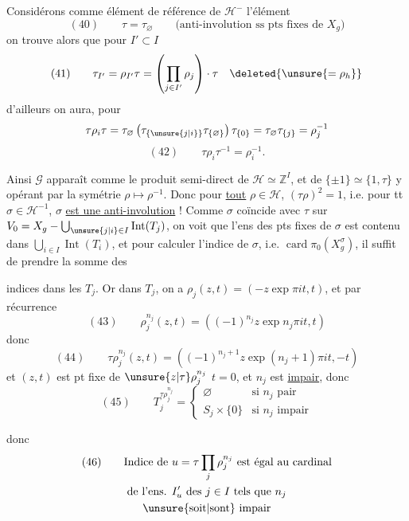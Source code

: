 
Considérons comme élément de référence de $\mathcal H^{-}$ l'élément
\[
(40)\qquad \tau=\tau_{\varnothing}\qquad
\text{(anti-involution ss pts fixes de $X_g$)}
\]
on trouve alors  que pour $I'\subset I$
\[
(41)\qquad \tau_{I'}=\rho_{I'}\tau=
\left(\prod_{j\in I'}\rho_j\right)\cdot\tau\quad
\deleted{\unsure{=\rho_h}}
\]
d'ailleurs on aura, pour 
\[
\tau\rho_{i}\tau
=\tau_{\varnothing}\left(\tau_{\{\unsure{j|i}\}}\tau_{\{\varnothing\}}\right)
\tau_{\{0\}}
=\tau_{\varnothing}\tau_{\{j\}}=\rho_j^{-1}
\]
\[
(42)\qquad \tau\rho_{i}\tau^{-1}=\rho_{i}^{-1}.
\]

Ainsi $\mathcal G$ apparaît comme le produit semi-direct de $\mathcal H\simeq\mathbb Z^I$, et de
$\{\pm1\}\simeq\{1,\tau\}$ y opérant par la symétrie
$\rho\longmapsto\rho^{-1}$. Donc pour \uline{tout} $\rho\in\mathcal H$,
$(\tau\rho)^2=1$, i.e. pour tt
$\sigma\in\mathcal H^{-1}$,
$\sigma$  \uline{est une anti-involution} !
Comme $\sigma$ coïncide avec $\tau$ sur
$V_0=X_g-\bigcup_{\unsure{j|i}\in I}\operatorname{Int}(T_j)$,
on voit que l'ens des pts fixes de $\sigma$ est contenu dans
$\bigcup_{i\in I}\operatorname{Int}(T_i)$, et pour calculer l'indice de $\sigma$,
i.e. $\operatorname{card}\pi_0(X_g^\sigma)$, il suffit de prendre la somme des


indices dans les $T_j$. Or dans $T_j$, on a 
$\rho_j(z,t)=(-z\exp\pi it,t)$, et par récurrence
\[
(43)\qquad \rho_j^{n_j}(z,t)=\left((-1)^{n_j}z\exp n_j\pi it,t\right)
\]
donc
\[
(44)\qquad \tau\rho_j^{n_j}(z,t)=
\left((-1)^{n_j+1}z\exp(n_j+1)\pi it,-t\right)
\]
et  $(z,t)$ est pt fixe de
$\unsure{z|\tau}\rho_j^{n_j}$ 
$t=0$,  et $n_j$ est \uline{impair}, donc
\[
(45)\qquad T_j^{\tau\rho_j^{n_j}}=
\begin{cases}
\varnothing&\text{si $n_j$ pair}\\
S_j\times\{0\}&\text{si $n_j$ impair}
\end{cases}
\]

donc
\[
\begin{gathered}
(46)\qquad \text{Indice de }u=\tau\prod_j\rho_j^{n_j}\text{ est égal au cardinal}\\
\text{de l'ens. }I'_u\text{ des }j\in I\text{ tels que }n_j\\
\text{\unsure{soit|sont} impair}
\end{gathered}
\]


